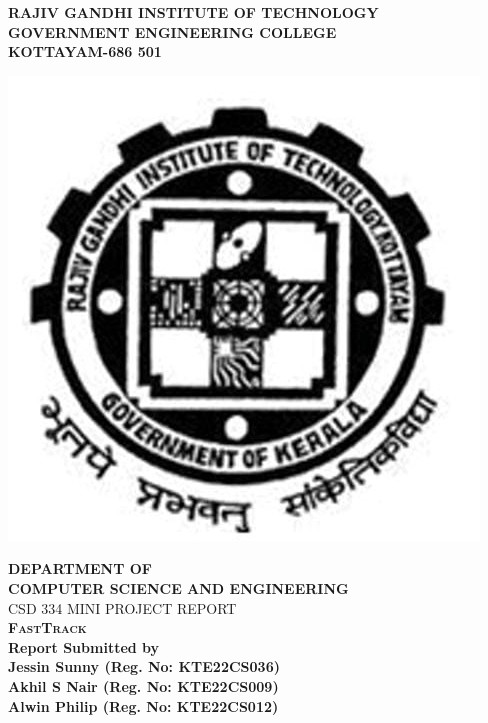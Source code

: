 \begin{center}
\vspace{8pt}
\Large\textbf{RAJIV GANDHI INSTITUTE OF TECHNOLOGY}\\
\vspace{8pt}
\Large\textbf{GOVERNMENT ENGINEERING COLLEGE}\\
\vspace{8pt}
\Large\textbf{KOTTAYAM-686 501}\\
\vspace{8pt}
\begin{center}
\includegraphics[scale=0.25]{rit.jpg}
\end{center}
\normalsize \textbf{DEPARTMENT OF \\ COMPUTER SCIENCE AND ENGINEERING} \\
\vspace{10pt}
\Large{CSD 334 MINI PROJECT REPORT}\\ \vspace{15pt}
\Large {\textsc{\textbf{FastTrack}}}\\
\vspace{20pt}
\large \textbf{Report Submitted by }\\
\vspace{10pt}
\large {\textbf{Jessin Sunny (Reg. No: KTE22CS036)}}\\
\large {\textbf{Akhil S Nair (Reg. No: KTE22CS009) }}\\
\large {\textbf{Alwin Philip (Reg. No: KTE22CS012)}}\\

\end{center}
